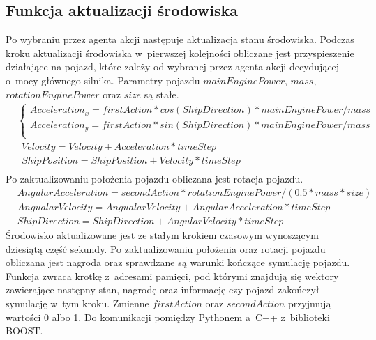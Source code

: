 \documentclass[12pt, oneside]{article}
\begin{document}
\subsection{Funkcja aktualizacji środowiska}
Po wybraniu przez agenta akcji następuje aktualizacja stanu środowiska.
Podczas kroku aktualizacji środowiska w~pierwszej kolejności obliczane jest przyspieszenie działające na pojazd, które zależy od wybranej przez agenta akcji decydującej o~mocy głównego silnika. 
Parametry pojazdu $mainEnginePower$, $mass$, $rotationEnginePower$ oraz $size$ są stałe.
\begin{equation}
\begin{aligned}
&\begin{cases}
Acceleration_x = firstAction * cos(ShipDirection) * mainEnginePower / mass \\
Acceleration_y = firstAction* sin(ShipDirection) * mainEnginePower / mass \\
\end{cases}\\
&~~Velocity = Velocity + Acceleration * timeStep \\
&~~ShipPosition = ShipPosition + Velocity * timeStep\\
\end{aligned}
\end{equation}
Po zaktualizowaniu położenia pojazdu obliczana jest rotacja pojazdu.
\begin{equation}
\begin{aligned}
&AngularAcceleration = secondAction * rotationEnginePower / (0.5*mass*size)\\
&AngualarVelocity = AngualarVelocity + AngularAcceleration * timeStep\\
&ShipDirection = ShipDirection + AngularVelocity * timeStep
\end{aligned}
\end{equation}
Środowisko aktualizowane jest ze stałym krokiem czasowym wynoszącym dziesiątą część sekundy.
Po zaktualizowaniu położenia oraz rotacji pojazdu obliczana jest nagroda oraz sprawdzane są warunki kończące symulację pojazdu. 
Funkcja zwraca krotkę z~adresami pamięci, pod którymi znajdują się wektory zawierające następny stan, nagrodę oraz informację czy pojazd zakończył symulację w~tym kroku. Zmienne $firstAction$ oraz $secondAction$ przyjmują wartości 0 albo 1.
Do komunikacji pomiędzy Pythonem a~C++ z~biblioteki BOOST\cite{boost}. 
\end{document}
